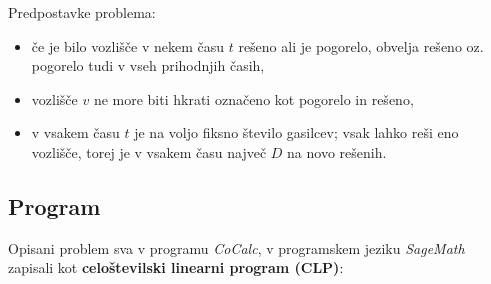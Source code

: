 \documentclass[a4paper, 12pt]{article}
\begin{document}
\noindent Predpostavke problema: 
\begin{itemize}
    \item če je bilo vozlišče v nekem času $t$ rešeno ali je pogorelo, obvelja rešeno oz. pogorelo tudi v 
    vseh prihodnjih časih,
    \item vozlišče $v$ ne more biti hkrati označeno kot pogorelo in rešeno,
    \item v vsakem času $t$ je na voljo fiksno število gasilcev; vsak lahko reši
    eno vozlišče, torej je v vsakem času največ $D$ na novo rešenih.
\end{itemize}

\subsection{Program}
\overfullrule=0pt
\noindent Opisani problem sva v programu \emph{CoCalc}, v programskem jeziku \emph{SageMath} 
zapisali kot \textbf{celoštevilski linearni program (CLP)}: \\
\end{document}
